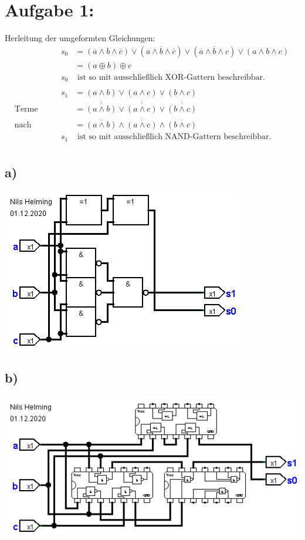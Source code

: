 \documentclass[]{article}
\newcommand{\V}{\lor}
\newcommand{\A}{\land}
\newcommand{\T}[1]{\overline{#1}}
\begin{document}

\section*{Aufgabe 1:}
	Herleitung der umgeformten Gleichungen:
	\begin{align*}
		&& s_0 &= (\T{a} \A b \A \T{c}) \V (a \A \T{b} \A \T{c}) \V (\T{a} \A \T{b} \A c) \V (a \A b \A c) &&\\
		&& &= (a \oplus b) \oplus c &&\\
		&& s_0 &\text{ ist so mit ausschließlich XOR-Gattern beschreibbar.}&&\\
		\\
		&& s_1 &= (a \A b) \V (a \A c) \V (b \A c) &&\\
		&\text{Terme doppelt negieren:}&  &= \T{\T{(a \A b)}} \V \T{\T{(a \A c)}} \V \T{\T{(b \A c)}} &&\\
		&\text{nach DeMorgan:}&  &= \T{\T{(a \A b)} \A \T{(a \A c)} \A \T{(b \A c)}} &&\\
		&& s_1 &\text{ ist so mit ausschließlich NAND-Gattern beschreibbar.}&&\\
	\end{align*}
\subsection*{a)}
	\begin{center}\includegraphics[scale=0.7]{Bilder/1a.png}\end{center}
\subsection*{b)}
	\begin{center}\includegraphics[scale=0.7]{Bilder/1b.png}\end{center}
\end{document}
